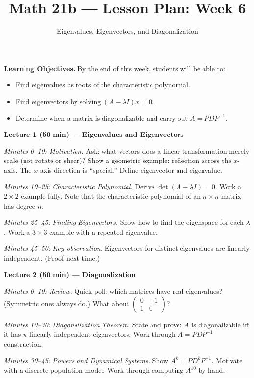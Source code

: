 \documentclass{amsart}
\title{Math 21b --- Lesson Plan: Week 6}
\subtitle{Eigenvalues, Eigenvectors, and Diagonalization}
\date{}
\begin{document}
\maketitle

\textbf{Learning Objectives.} By the end of this week, students will be able to:
\begin{itemize}
    \item Find eigenvalues as roots of the characteristic polynomial.
    \item Find eigenvectors by solving $(A - \lambda I)x = 0$.
    \item Determine when a matrix is diagonalizable and carry out $A = PDP^{-1}$.
\end{itemize}

\bigskip

\textbf{Lecture 1 (50 min) --- Eigenvalues and Eigenvectors}

\textit{Minutes 0--10: Motivation.} Ask: what vectors does a linear transformation merely scale (not rotate or shear)? Show a geometric example: reflection across the $x$-axis. The $x$-axis direction is ``special.'' Define eigenvector and eigenvalue.

\textit{Minutes 10--25: Characteristic Polynomial.} Derive $\det(A - \lambda I) = 0$. Work a $2\times 2$ example fully. Note that the characteristic polynomial of an $n \times n$ matrix has degree $n$.

\textit{Minutes 25--45: Finding Eigenvectors.} Show how to find the eigenspace for each $\lambda$. Work a $3\times 3$ example with a repeated eigenvalue.

\textit{Minutes 45--50: Key observation.} Eigenvectors for distinct eigenvalues are linearly independent. (Proof next time.)

\bigskip

\textbf{Lecture 2 (50 min) --- Diagonalization}

\textit{Minutes 0--10: Review.} Quick poll: which matrices have real eigenvalues? (Symmetric ones always do.) What about $\begin{pmatrix}0&-1\\1&0\end{pmatrix}$?

\textit{Minutes 10--30: Diagonalization Theorem.} State and prove: $A$ is diagonalizable iff it has $n$ linearly independent eigenvectors. Work through $A = PDP^{-1}$ construction.

\textit{Minutes 30--45: Powers and Dynamical Systems.} Show $A^k = PD^kP^{-1}$. Motivate with a discrete population model. Work through computing $A^{10}$ by hand.
\end{document}
